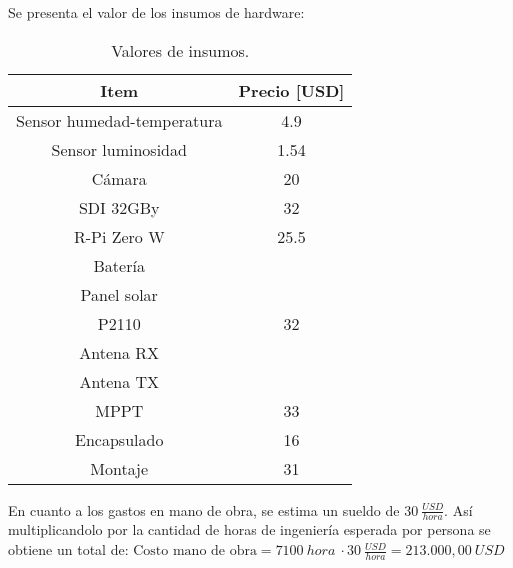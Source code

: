 Se presenta el valor de los insumos de hardware:
\begin{table}[H]
\centering
\begin{tabular}{|c|c|}
\hline
\textbf{Item}                                                         & \textbf{Precio [USD]}				  \\ \hline
Sensor humedad-temperatura 											  & 4.9                                   \\ \hline
Sensor luminosidad                                                    & 1.54                                  \\ \hline
Cámara                                                                & 20                                    \\ \hline
SDI 32GBy                                                             & 32                                    \\ \hline
R-Pi Zero W                                                           & 25.5                                  \\ \hline
Batería                                                               & \TBD                   				  \\ \hline
Panel solar                                                           & \TBD                   				  \\ \hline
P2110                                                                 & 32                                    \\ \hline
Antena RX                                                             & \TBD                   				  \\ \hline
Antena TX                                                             & \TBD                   				  \\ \hline
MPPT                                                                  & 33                                    \\ \hline
Encapsulado                                                           & 16                                    \\ \hline
Montaje                                                               & 31                                    \\ \hline
\end{tabular}
\caption{Valores de insumos.}
\end{table}


En cuanto a los gastos en mano de obra, se estima un sueldo de $30 \ \frac{USD}{hora}$. Así multiplicandolo por la cantidad de horas de ingeniería esperada por persona se obtiene un total de: $\text{Costo mano de obra} = 7100 \ hora \ \cdot 30 \ \frac{USD}{hora} = 213.000,00 \ USD$

